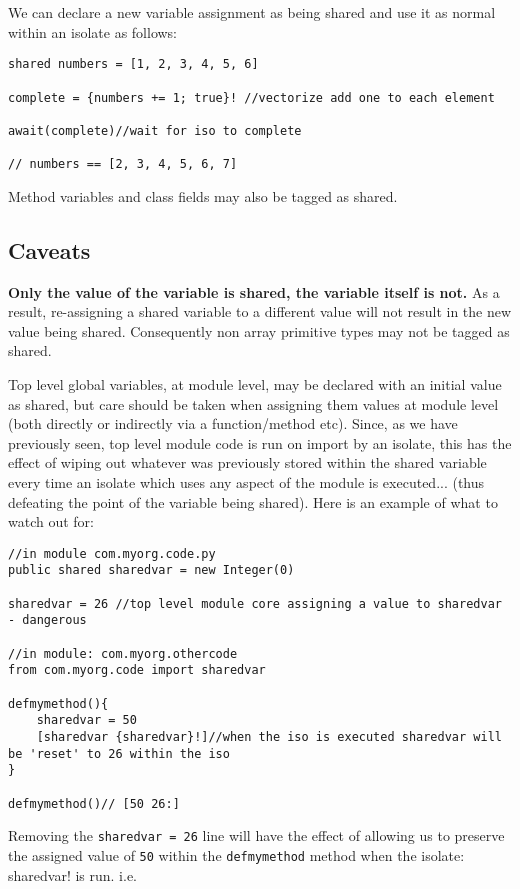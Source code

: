 \documentclass[conc-doc]{subfiles}
\begin{document}
We can declare a new variable assignment as being shared and use it as normal within an isolate as follows:
\begin{lstlisting}
shared numbers = [1, 2, 3, 4, 5, 6]

complete = {numbers += 1; true}! //vectorize add one to each element

await(complete)//wait for iso to complete

// numbers == [2, 3, 4, 5, 6, 7]
\end{lstlisting}

Method variables and class fields may also be tagged as shared.

\subsection{Caveats}
\textbf{Only the value of the variable is shared, the variable itself is not.} As a result, re-assigning a shared variable to a different value will not result in the new value being shared. Consequently non array primitive types may not be tagged as shared.

Top level global variables, at module level, may be declared with an initial value as shared, but care should be taken when assigning them values at module level (both directly or indirectly via a function/method etc). Since, as we have previously seen, top level module code is run on import by an isolate, this has the effect of wiping out whatever was previously stored within the shared variable every time an isolate which uses any aspect of the module is executed... (thus defeating the point of the variable being shared). Here is an example of what to watch out for:

\begin{lstlisting}
//in module com.myorg.code.py
public shared sharedvar = new Integer(0)

sharedvar = 26 //top level module core assigning a value to sharedvar - dangerous

//in module: com.myorg.othercode
from com.myorg.code import sharedvar

defmymethod(){
	sharedvar = 50
	[sharedvar {sharedvar}!]//when the iso is executed sharedvar will be 'reset' to 26 within the iso
}

defmymethod()// [50 26:]
\end{lstlisting}

Removing the \lstinline{sharedvar = 26} line will have the effect of allowing us to preserve the assigned value of \lstinline{50} within the \lstinline{defmymethod} method when the isolate: {sharedvar}! is run. i.e.
\end{document}
